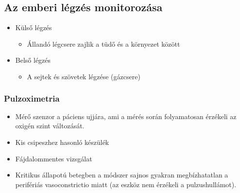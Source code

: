 \subsection{Az emberi légzés monitorozása}
\begin{itemize}
    \item Külső légzés
    \begin{itemize}
        \item Állandó légcsere zajlik a tüdő és a környezet között
    \end{itemize}
    \item Belső légzés
    \begin{itemize}
        \item A sejtek és szövetek légzése (gázcsere)
    \end{itemize}
\end{itemize}

\subsubsection{Pulzoximetria}
\begin{itemize}
    \item Mérő szenzor a páciens ujjára, ami a mérés során folyamatosan érzékeli az oxigén szint változását.
    \item Kis csipeszhez hasonló készülék
    \item Fájdalommentes vizsgálat
    \item Kritikus állapotú betegben a módszer sajnos gyakran megbízhatatlan a perifériás vasoconstrictio miatt (az eszköz nem érzékeli a pulzushullámot).
\end{itemize}

